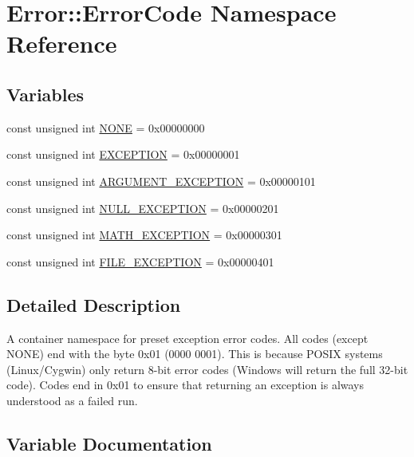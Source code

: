 \hypertarget{namespace_error_1_1_error_code}{}\section{Error\+:\+:Error\+Code Namespace Reference}
\label{namespace_error_1_1_error_code}
\subsection*{Variables}
\begin{DoxyCompactItemize}
\item 
const unsigned int \hyperlink{namespace_error_1_1_error_code_a257bb41202c970fe16218971c3865153}{N\+O\+NE} = 0x00000000
\item 
const unsigned int \hyperlink{namespace_error_1_1_error_code_ae85b7b550a5a82a4f04d8d5df167f081}{E\+X\+C\+E\+P\+T\+I\+ON} = 0x00000001
\item 
const unsigned int \hyperlink{namespace_error_1_1_error_code_acf46c5671e39c66ef96a9a701c8cb91f}{A\+R\+G\+U\+M\+E\+N\+T\+\_\+\+E\+X\+C\+E\+P\+T\+I\+ON} = 0x00000101
\item 
const unsigned int \hyperlink{namespace_error_1_1_error_code_a16746831d05707d52cb441c12ed4b471}{N\+U\+L\+L\+\_\+\+E\+X\+C\+E\+P\+T\+I\+ON} = 0x00000201
\item 
const unsigned int \hyperlink{namespace_error_1_1_error_code_a712ca5dd58f19a6c3804bea7d62a71d1}{M\+A\+T\+H\+\_\+\+E\+X\+C\+E\+P\+T\+I\+ON} = 0x00000301
\item 
const unsigned int \hyperlink{namespace_error_1_1_error_code_ad646bbf666b6a07dc245d1e1b47107be}{F\+I\+L\+E\+\_\+\+E\+X\+C\+E\+P\+T\+I\+ON} = 0x00000401
\end{DoxyCompactItemize}


\subsection{Detailed Description}
A container namespace for preset exception error codes. All codes (except N\+O\+NE) end with the byte 0x01 (0000 0001). This is because P\+O\+S\+IX systems (Linux/\+Cygwin) only return 8-\/bit error codes (Windows will return the full 32-\/bit code). Codes end in 0x01 to ensure that returning an exception is always understood as a failed run. 

\subsection{Variable Documentation}
\hypertarget{namespace_error_1_1_error_code_acf46c5671e39c66ef96a9a701c8cb91f}{}\label{namespace_error_1_1_error_code_acf46c5671e39c66ef96a9a701c8cb91f} 
